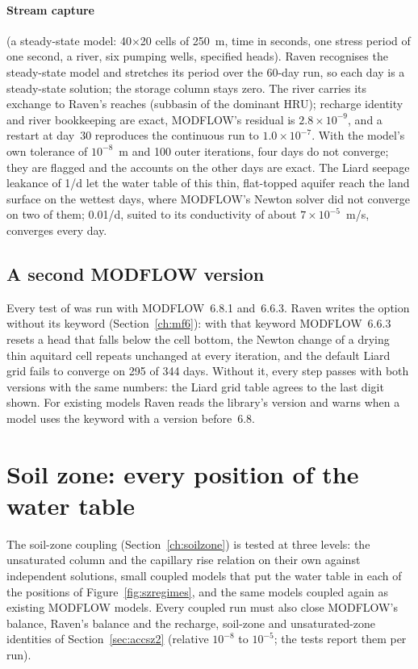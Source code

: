 \paragraph{Stream capture} (a steady-state model: 40$\times$20 cells of 250~m, time in seconds, one stress period of one
second, a river, six pumping wells, specified heads). Raven recognises the steady-state model and stretches its period over
the 60-day run, so each day is a steady-state solution; the storage column stays zero. The river carries its exchange to
Raven's reaches (subbasin of the dominant HRU); recharge identity and river bookkeeping are exact, MODFLOW's residual is
$2.8\times10^{-9}$, and a restart at day~30 reproduces the continuous run to $1.0\times10^{-7}$. With the model's own
tolerance of $10^{-8}$~m and 100 outer iterations, four days do not converge; they are flagged and the accounts on the
other days are exact. The Liard seepage leakance of 1/d let the water table of this thin, flat-topped aquifer reach the land
surface on the wettest days, where MODFLOW's Newton solver did not converge on two of them; 0.01/d, suited to its
conductivity of about $7\times10^{-5}$~m/s, converges every day.


\subsection{A second MODFLOW version}
Every test of  was run with MODFLOW~6.8.1 and~6.6.3. Raven writes the  option
without its  keyword (Section~\ref{ch:mf6}): with that keyword MODFLOW~6.6.3 resets a head that falls
below the cell bottom, the Newton change of a drying thin aquitard cell repeats unchanged at every iteration, and the default
Liard grid fails to converge on 295 of 344 days. Without it, every step passes with both versions with the same numbers: the
Liard grid table agrees to the last digit shown. For existing models Raven reads the library's version and warns when a model uses the
keyword with a version before~6.8.



\section{Soil zone: every position of the water table}\label{sec:vsoilzone}
The soil-zone coupling (Section~\ref{ch:soilzone}) is tested at three levels: the unsaturated column and the capillary
rise relation on their own against independent solutions, small coupled models that put the water table in each of
the positions of Figure~\ref{fig:szregimes}, and the same models coupled again as existing MODFLOW models. Every
coupled run must also close MODFLOW's balance, Raven's balance and the recharge, soil-zone and unsaturated-zone
identities of Section~\ref{sec:accsz2} (relative $10^{-8}$ to $10^{-5}$; the tests report them per run).

